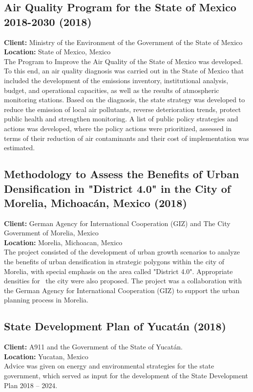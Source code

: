 \documentclass[
	a4paper,
	12pt,
	unnumberedsections,
]{CSSullivanBusinessReport}
\begin{document}
\subsection{Air Quality Program for the State of Mexico 2018-2030 (2018)}
\textbf{Client:}  Ministry of the Environment of the Government of the State of Mexico \\
\textbf{Location:}  State of Mexico, Mexico \\[0.5em]
 The Program to Improve the Air Quality of the State of Mexico was developed. To this end, an air quality diagnosis was carried out in the State of Mexico that included the development of the emissions inventory, institutional analysis, budget, and operational capacities, as well as the results of atmospheric monitoring stations. Based on the diagnosis, the state strategy was developed to reduce the emission of local air pollutants, reverse deterioration trends, protect public health and strengthen monitoring. A list of public policy strategies and actions was developed, where the policy actions were prioritized, assessed in terms of their reduction of air contaminants and their cost of implementation was estimated.

\subsection{Methodology to Assess the Benefits of Urban Densification in "District 4.0" in the City of Morelia, Michoacán, Mexico (2018)}
\textbf{Client:}  German Agency for International Cooperation (GIZ) and The City Government of Morelia, Mexico \\
\textbf{Location:}  Morelia, Michoacan, Mexico \\[0.5em]
 The project consisted of the development of urban growth scenarios to analyze the benefits of urban densification in strategic polygons within the city of Morelia, with special emphasis on the area called "District 4.0". Appropriate densities for  the city were also proposed. The project was a collaboration with the German Agency for International Cooperation (GIZ) to support the urban planning process in Morelia.

\subsection{State Development Plan of Yucatán (2018)}
\textbf{Client:}  A911 and the Government of the State of Yucatán. \\
\textbf{Location:}  Yucatan, Mexico \\[0.5em]
 Advice was given on energy and environmental strategies for the state government, which served as input for the development of the State Development Plan 2018 – 2024.
\end{document}

